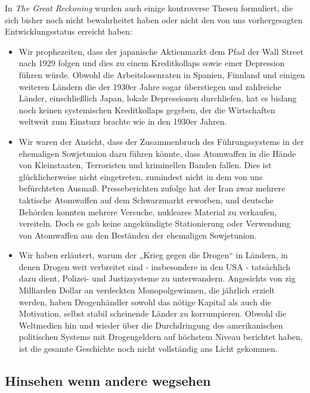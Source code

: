 \documentclass[
  a5paper,
  smalldemyvopaper,10pt,twoside,onecolumn,openright,extrafontsizes,hidelinks]{memoir}
\begin{document}
In \emph{The Great Reckoning} wurden auch einige kontroverse Thesen
formuliert, die sich bisher noch nicht bewahrheitet haben oder nicht den
von uns vorhergesagten Entwicklungsstatus erreicht haben:

\begin{itemize}
\item
  Wir prophezeiten, dass der japanische Aktienmarkt dem Pfad der Wall
  Street nach 1929 folgen und dies zu einem Kreditkollaps sowie einer
  Depression führen würde. Obwohl die Arbeitslosenraten in Spanien,
  Finnland und einigen weiteren Ländern die der 1930er Jahre sogar
  überstiegen und zahlreiche Länder, einschließlich Japan, lokale
  Depressionen durchliefen, hat es bislang noch keinen systemischen
  Kreditkollaps gegeben, der die Wirtschaften weltweit zum Einsturz
  brachte wie in den 1930er Jahren.
\item
  Wir waren der Ansicht, dass der Zusammenbruch des Führungssystems in
  der ehemaligen Sowjetunion dazu führen könnte, dass Atomwaffen in die
  Hände von Kleinstaaten, Terroristen und kriminellen Banden fallen.
  Dies ist glücklicherweise nicht eingetreten, zumindest nicht in dem
  von uns befürchteten Ausmaß. Presseberichten zufolge hat der Iran zwar
  mehrere taktische Atomwaffen auf dem Schwarzmarkt erworben, und
  deutsche Behörden konnten mehrere Versuche, nukleares Material zu
  verkaufen, vereiteln. Doch es gab keine angekündigte Stationierung
  oder Verwendung von Atomwaffen aus den Beständen der ehemaligen
  Sowjetunion.
\item
  Wir haben erläutert, warum der „Krieg gegen die Drogen`` in Ländern,
  in denen Drogen weit verbreitet sind - insbesondere in den USA -
  tatsächlich dazu dient, Polizei- und Justizsysteme zu unterwandern.
  Angesichts von zig Milliarden Dollar an verdeckten Monopolgewinnen,
  die jährlich erzielt werden, haben Drogenhändler sowohl das nötige
  Kapital als auch die Motivation, selbst stabil scheinende Länder zu
  korrumpieren. Obwohl die Weltmedien hin und wieder über die
  Durchdringung des amerikanischen politischen Systems mit Drogengeldern
  auf höchstem Niveau berichtet haben, ist die gesamte Geschichte noch
  nicht vollständig ans Licht gekommen.
\end{itemize}

\subsection{Hinsehen wenn andere
wegsehen}\label{hinsehen-wenn-andere-wegsehen}
\end{document}
